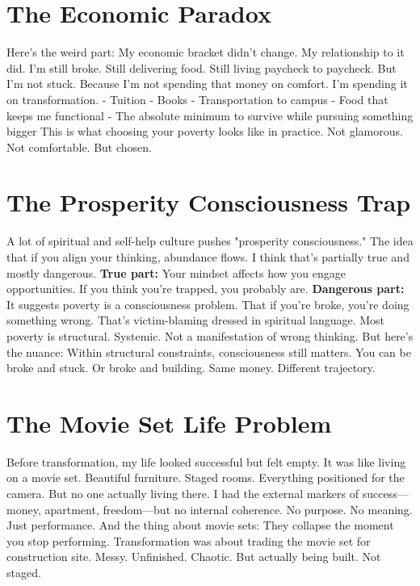 \section{The Economic Paradox}

Here's the weird part:
My economic bracket didn't change. My relationship to it did.
I'm still broke. Still delivering food. Still living paycheck to paycheck.
But I'm not stuck.
Because I'm not spending that money on comfort. I'm spending it on transformation.
- Tuition
- Books
- Transportation to campus
- Food that keeps me functional
- The absolute minimum to survive while pursuing something bigger
This is what choosing your poverty looks like in practice.
Not glamorous. Not comfortable. But chosen.

\section{The Prosperity Consciousness Trap}

A lot of spiritual and self-help culture pushes "prosperity consciousness." The idea that if you align your thinking, abundance flows.
I think that's partially true and mostly dangerous.
\textbf{True part:} Your mindset affects how you engage opportunities. If you think you're trapped, you probably are.
\textbf{Dangerous part:} It suggests poverty is a consciousness problem. That if you're broke, you're doing something wrong.
That's victim-blaming dressed in spiritual language.
Most poverty is structural. Systemic. Not a manifestation of wrong thinking.
But here's the nuance:
Within structural constraints, consciousness still matters. You can be broke and stuck. Or broke and building.
Same money. Different trajectory.

\section{The Movie Set Life Problem}

Before transformation, my life looked successful but felt empty.
It was like living on a movie set.
Beautiful furniture. Staged rooms. Everything positioned for the camera. But no one actually living there.
I had the external markers of success—money, apartment, freedom—but no internal coherence. No purpose. No meaning.
Just performance.
And the thing about movie sets: They collapse the moment you stop performing.
Transformation was about trading the movie set for construction site.
Messy. Unfinished. Chaotic. But actually being built. Not staged.

